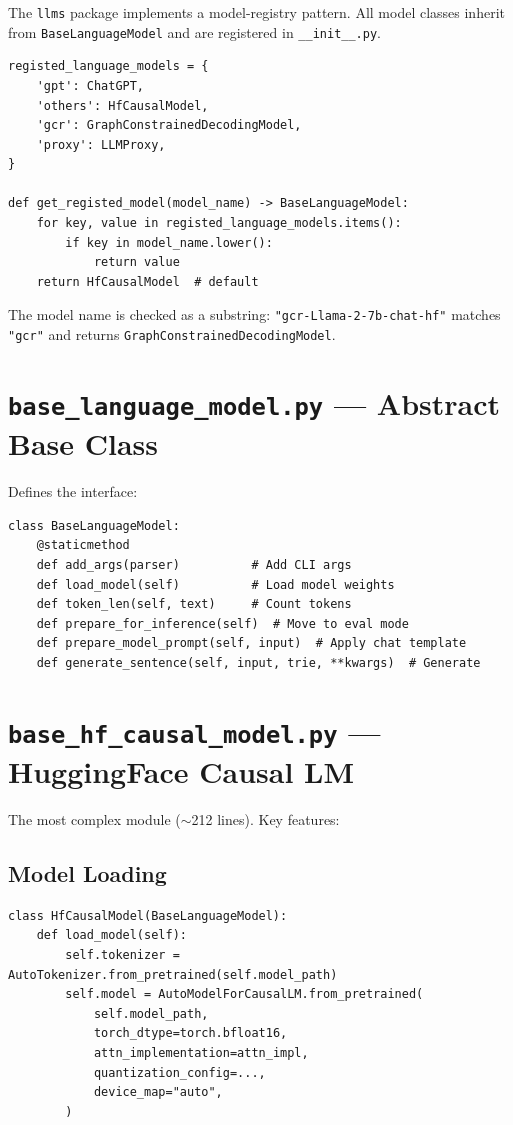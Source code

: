 \documentclass[11pt,a4paper,oneside,openany]{book}
\theoremstyle{definition}
\newcommand{\code}[1]{\texttt{#1}}
\begin{document}
The \texttt{llms} package implements a model-registry pattern. All model classes inherit from \texttt{BaseLanguageModel} and are registered in \texttt{\_\_init\_\_.py}.

\begin{lstlisting}
registed_language_models = {
    'gpt': ChatGPT,
    'others': HfCausalModel,
    'gcr': GraphConstrainedDecodingModel,
    'proxy': LLMProxy,
}

def get_registed_model(model_name) -> BaseLanguageModel:
    for key, value in registed_language_models.items():
        if key in model_name.lower():
            return value
    return HfCausalModel  # default
\end{lstlisting}

The model name is checked as a substring: \code{"gcr-Llama-2-7b-chat-hf"} matches \code{"gcr"} and returns \code{GraphConstrainedDecodingModel}.

\section{\texttt{base\_language\_model.py} --- Abstract Base Class}

Defines the interface:

\begin{lstlisting}
class BaseLanguageModel:
    @staticmethod
    def add_args(parser)          # Add CLI args
    def load_model(self)          # Load model weights
    def token_len(self, text)     # Count tokens
    def prepare_for_inference(self)  # Move to eval mode
    def prepare_model_prompt(self, input)  # Apply chat template
    def generate_sentence(self, input, trie, **kwargs)  # Generate
\end{lstlisting}

\section{\texttt{base\_hf\_causal\_model.py} --- HuggingFace Causal LM}

The most complex module ($\sim$212 lines). Key features:

\subsection{Model Loading}

\begin{lstlisting}
class HfCausalModel(BaseLanguageModel):
    def load_model(self):
        self.tokenizer = AutoTokenizer.from_pretrained(self.model_path)
        self.model = AutoModelForCausalLM.from_pretrained(
            self.model_path,
            torch_dtype=torch.bfloat16,
            attn_implementation=attn_impl,
            quantization_config=...,
            device_map="auto",
        )
\end{lstlisting}
\end{document}
